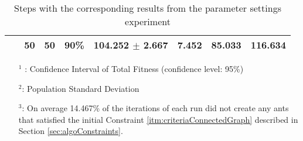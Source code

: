 \begin{table}
\begin{tabular}{|l|l|l|c||c|c|c|c|}
    ~ & 50 & 50 & \textbf{90\%} & 104.252 $\pm$ 2.667 & 7.452 & 85.033 & 116.634\\
    \hline
    \end{tabular}
    \caption {Steps with the corresponding results from the parameter settings experiment}
    \tiny
    \begin{itemize}[noitemsep]
    \item[$^1$ :] Confidence Interval of Total Fitness (confidence level: 95\%)
    \item[$^2$:] Population Standard Deviation 
    \item[$^3$:] On average 14.467\% of the iterations of each run did not create any ants that satisfied the initial Constraint \ref{itm:criteriaConnectedGraph} described in Section \vref{sec:algoConstraints}.
    \end{itemize}
    \label{table:pm1}
\end{table}

